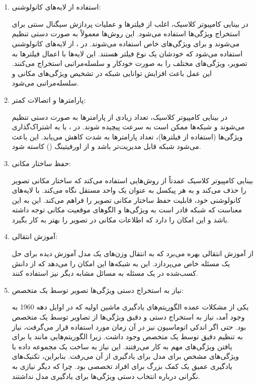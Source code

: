 \documentclass{article}
\begin{document}
\section{}
\begin{enumerate}
\item استفاده از لایه‌های کانولوشنی:

    در بینایی کامپیوتر کلاسیک، اغلب از فیلترها و عملیات پردازش سیگنال سنتی برای استخراج ویژگی‌ها استفاده می‌شود. این روش‌ها معمولاً به صورت دستی تنظیم می‌شوند و برای ویژگی‌های خاص استفاده می‌شوند.
    در ، از لایه‌های کانولوشنی استفاده می‌شود که خودشان یک نوع فیلتر هستند. این لایه‌ها با اعمال فیلترها به تصویر، ویژگی‌های مختلف را به صورت خودکار و سلسله‌مراتبی استخراج می‌کنند. این عمل باعث افزایش توانایی شبکه در تشخیص ویژگی‌های مکانی و سلسله‌مراتبی می‌شود.

\item پارامترها و اتصالات کمتر:

    در بینایی کامپیوتر کلاسیک، تعداد زیادی از پارامترها به صورت دستی تنظیم می‌شوند و شبکه‌ها ممکن است به سرعت پیچیده شوند.
    در ، با به اشتراک‌گذاری ویژگی‌ها (استفاده از فیلترها)، تعداد پارامترها به شدت کاهش می‌یابد. این باعث می‌شود شبکه قابل مدیریت‌تر باشد و از اورفیتینگ () کاسته شود.

\item حفظ ساختار مکانی:

    بینایی کامپیوتر کلاسیک عمدتاً از روش‌هایی استفاده می‌کند که ساختار مکانی تصویر را حذف می‌کند و به هر پیکسل به عنوان یک واحد مستقل نگاه می‌کند.
     با لایه‌های کانولوشنی خود، قابلیت حفظ ساختار مکانی تصویر را فراهم می‌کند. این به این معناست که شبکه قادر است به ویژگی‌ها و الگوهای موقعیت مکانی توجه داشته باشد و این امکان را دارد که اطلاعات مکانی در تصویر را بهتر به کار بگیرد.

\item آموزش انتقالی:

     از آموزش انتقالی بهره می‌برد که به انتقال وزن‌های یک مدل آموزش دیده برای حل یک مسئله خاص می‌پردازد. این به شبکه‌ها این امکان را می‌دهد که از دانش کسب‌شده در یک مسئله به مسائل مشابه دیگر نیز استفاده کنند.

\item نیاز به استخراج دستی ویژگی‌ها تصویر توسط یک متخصص:

یکی از مشکلات عمده الگوریتم‌های یادگیری ماشین اولیه که در اوایل دهه 1960 به وجود آمد، نیاز به استخراج دستی و دقیق ویژگی‌ها از تصاویر توسط یک متخصص بود. حتی اگر اندکی اتوماسیون نیز در آن زمان مورد استفاده قرار می‌گرفت، نیاز به تنظیم دقیق توسط یک متخصص وجود داشت. زیرا الگوریتم‌هایی مانند  یا  برای یافتن ویژگی‌های مهم به کار می‌رفتند. این نیاز به ساخت یک مجموعه داده با ویژگی‌های مشخص برای مدل برای یادگیری از آن می‌رفت. بنابراین، تکنیک‌های یادگیری عمیق یک کمک بزرگ برای افراد تخصصی بود. چرا که دیگر نیازی به نگرانی درباره انتخاب دستی ویژگی‌ها برای یادگیری مدل نداشتند.


\end{enumerate}
\end{document}
